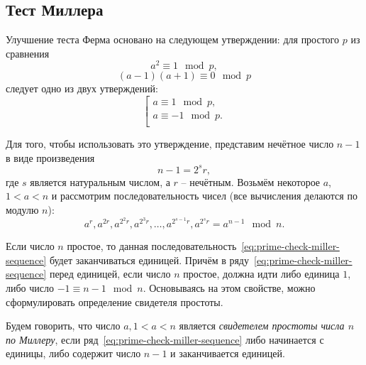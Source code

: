 \subsection{Тест Миллера}\label{section-prime-check-miller}

Улучшение теста Ферма основано на следующем утверждении: для простого $p$ из сравнения
    \[ a^2 \equiv 1 \mod p, \]
    \[ (a-1)(a+1) \equiv 0 \mod p \]
следует одно из двух утверждений: 
\[ \left[ \begin{array}{l}
     a \equiv 1 \mod p, \\
     a \equiv -1 \mod p. \\
\end{array} \right. \]

Для того, чтобы использовать это утверждение, представим нечётное число $n - 1$ в виде произведения
    \[ n-1 = 2^s r, \]
где $s$ является натуральным числом, а $r$ -- нечётным. Возьмём некоторое $a$, $1 < a < n$ и рассмотрим последовательность чисел (все вычисления делаются по модулю $n$):
\begin{equation}\label{eq:prime-check-miller-sequence}
	a^{r}, a^{2r}, a^{2^2 r}, a^{2^3 r}, \dots, a^{2^{s-1} r}, a^{2^s r} = a^{n-1} \mod n.
\end{equation}

Если число $n$ простое, то данная последовательность~\ref{eq:prime-check-miller-sequence} будет заканчиваться единицей. Причём в ряду~\ref{eq:prime-check-miller-sequence} перед единицей, если число $n$ простое, должна идти либо единица $1$, либо число $-1 \equiv n-1 \mod n$. Основываясь на этом свойстве, можно сформулировать определение свидетеля простоты.

Будем говорить, что число $a, 1 < a < n$ является \emph{свидетелем простоты числа $n$ по Миллеру}, если ряд~\ref{eq:prime-check-miller-sequence} либо начинается с единицы, либо содержит число $n-1$ и заканчивается единицей.

